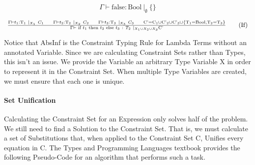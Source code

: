 \documentclass{article}
\begin{document}
\begin{equation}
    \Gamma \vdash \text{false} : \text{Bool} \ |_{\emptyset} \ \{\}
    \tag{False}
\end{equation}

\begin{equation}
\begin{array}{rcl}
    \frac{\Gamma \vdash t_{1} : \text{T}_{1} \ |_{X_{1}} \ C_{1} \indent \Gamma \vdash t_{2} : \text{T}_{2} \ |_{X_{2}} \ C_{2} \indent \Gamma \vdash t_{3} : \text{T}_{3} \ |_{X_{3}} \ C_{3} \indent
     \text{C'} = \text{C}_{1} \cup \text{C'}_{2} \cup \text{C'}_{3} \cup \{\text{T}_{1} = \text{Bool}, \text{T}_{2} = \text{T}_{3}\}}
    {\Gamma \vdash \text{ if } t_{1} \text{ then } t_{2} \text{ else } t_{3} \ : \ T_{2} \ |_{X_{1} \cup X_{2} \cup X_{3}} \text{C'}}
    \tag{If}
\end{array}
\end{equation}

Notice that AbsInf is the Constraint Typing Rule for Lambda Terms without an annotated Variable. Since we are calculating Constraint Sets rather than Types, this isn't an issue. We provide the Variable an arbitrary Type Variable X in order to represent it in the Constraint Set. When multiple Type Variables are created, we must ensure that each one is unique.

\paragraph{Set Unification}

Calculating the Constraint Set for an Expression only solves half of the problem. We still need to find a Solution to the Constraint Set. That is, we must calculate a set of Substitutions that, when applied to the Constraint Set C, Unifies every equation in C. The Types and Programming Languages textbook provides the following Pseudo-Code for an algorithm that performs such a task.
\end{document}
